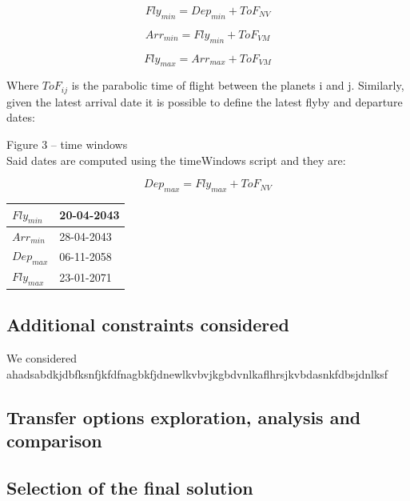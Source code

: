\documentclass[11pt,a4paper]{report}
\begin{document}
\begin{equation*}
    Fly_{min}=Dep_{min}+ ToF_{NV}
\end{equation*}

\begin{equation*}
    Arr_{min}=Fly_{min}+ ToF_{VM}
\end{equation*}

\begin{equation*}
    Fly_{max}=Arr_{max}+ ToF_{VM}
\end{equation*}

Where $ToF_{ij}$ is the parabolic time of flight between the planets i and j.
Similarly, given the latest arrival date it is possible to define the latest flyby and departure dates:

Figure 3 – time windows\\
Said dates are computed using the timeWindows script and they are:

\begin{equation*}
    Dep_{max}=Fly_{max}+ ToF_{NV}
\end{equation*}

\begin{table}[H]
\centering
\begin{tabular}{|l|l|}
\hline
$Fly_{min}$ & 20-04-2043 \\ \hline
$Arr_{min}$ & 28-04-2043 \\ \hline
$Dep_{max}$ & 06-11-2058 \\ \hline
$Fly_{max}$ & 23-01-2071 \\ \hline
\end{tabular}
\end{table}



\subsection{Additional constraints considered}
We considered ahadsabdkjdbfksnfjkfdfnagbkfjdnewlkvbvjkgbdvnlkaflhrsjkvbdasnkfdbsjdnlksf
\subsection{Transfer options exploration, analysis and comparison}

\subsection{Selection of the final solution}
\end{document}
